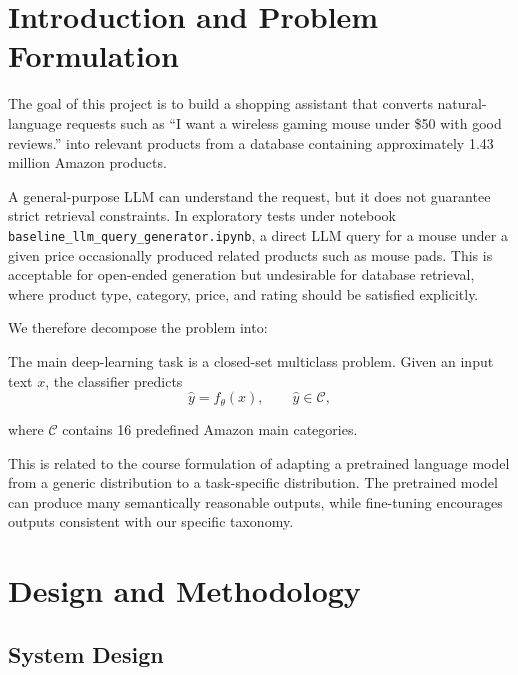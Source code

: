 \documentclass{article}
\begin{document}
\section{Introduction and Problem Formulation}

The goal of this project is to build a shopping assistant that converts
natural-language requests such as ``I want a wireless gaming mouse under \$50 with good reviews.'' into relevant products from a database containing approximately 1.43 million
Amazon products.

A general-purpose LLM can understand the request, but it does not guarantee
strict retrieval constraints. In exploratory tests under notebook \texttt{baseline\_llm\_query\_generator.ipynb}, a direct LLM query for a
mouse under a given price occasionally produced related products such as
mouse pads. This is acceptable for open-ended generation but undesirable for
database retrieval, where product type, category, price, and rating should be
satisfied explicitly.

We therefore decompose the problem into:

\begin{center}
\end{center}

The main deep-learning task is a closed-set multiclass problem. Given an input
text $x$, the classifier predicts
\[
\hat y=f_\theta(x), \qquad
\hat y \in \mathcal{C},
\]

where $\mathcal{C}$ contains 16 predefined Amazon main categories.

This is related to the course formulation of adapting a pretrained
language model from a generic distribution to a task-specific distribution.
The pretrained model can produce many semantically reasonable outputs, while
fine-tuning encourages outputs consistent with our specific taxonomy.


\section{Design and Methodology}

\subsection{System Design}
\end{document}

